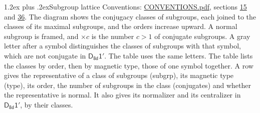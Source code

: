 \documentclass[10pt,a4paper]{article}
\makeatletter
\renewcommand\section{\@startsection{section}{1}{\z@}{-3ex plus -1ex minus -.2ex}%
  {1.2ex plus .2ex}{\normalfont\large\sffamily\bfseries\color{parttitle}}}
\numberwithin{equation}{section}
\newcommand{\grp}[1]{\mathsf{#1}}
\makeatother
\begin{document}
\section{Subgroup lattice}\label{s:subgroups}
Conventions: \href{../../CONVENTIONS.pdf}{CONVENTIONS.pdf}, sections \href{../../../rotation/CONVENTIONS.pdf\#conv.15}{15} and \href{../../CONVENTIONS.pdf\#conv.36}{36}.
The diagram shows the conjugacy classes of subgroups, each joined to the classes of its maximal subgroups, and the orders increase upward. \label{n:index.conjugates.c}\label{n:mark.conjugates}A normal subgroup is framed, and ${\times}c$ is the number $c > 1$ of conjugate subgroups. \label{n:mark.letter}A gray letter after a symbol distinguishes the classes of subgroups with that symbol, which are not conjugate in $\grp{D_{8d}1'}$. The table uses the same letters. The table lists the classes by order, then by magnetic type, those of one symbol together. \label{n:head.subgroup}\label{n:head.magnetic.type}\label{n:head.order}\label{n:head.conjugates}\label{n:head.normal}A row gives the representative of a class of subgroups (subgrp), its magnetic type (type), its order, the number of subgroups in the class (conjugates) and whether the representative is normal. \label{n:head.normalizer}\label{n:head.centralizer}It also gives its normalizer and its centralizer in $\grp{D_{8d}1'}$, by their classes. 
\end{document}
